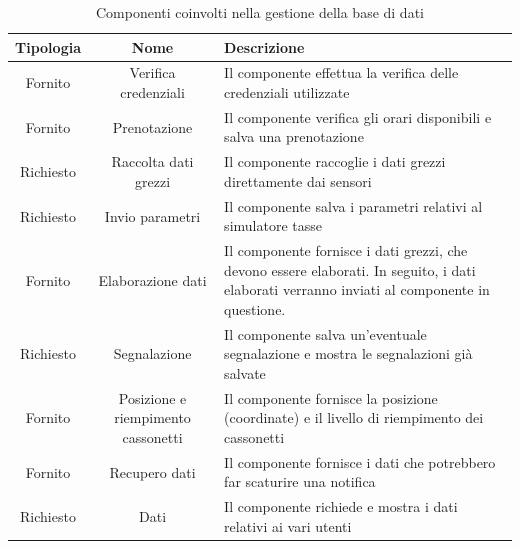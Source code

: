 \begin{table}[H]
    \centering
    \begin{tabular}{|c|c|p{9cm}|}
        \hline
        \textbf{Tipologia} & \textbf{Nome} & \textbf{Descrizione} \\
        \hline
        Fornito & Verifica credenziali & Il componente effettua la verifica delle credenziali utilizzate \\
        \hline
        Fornito & Prenotazione & Il componente verifica gli orari disponibili e salva una prenotazione \\
        \hline
        Richiesto & Raccolta dati grezzi & Il componente raccoglie i dati grezzi direttamente dai sensori \\
        \hline
        Richiesto & Invio parametri & Il componente salva i parametri relativi al simulatore tasse \\
        \hline
        Fornito & Elaborazione dati & Il componente fornisce i dati grezzi, che devono essere elaborati. In seguito, i dati elaborati verranno inviati al componente in questione. \\
        \hline
        Richiesto & Segnalazione & Il componente salva un'eventuale segnalazione e mostra le segnalazioni già salvate \\
        \hline
        Fornito & Posizione e riempimento cassonetti & Il componente fornisce la posizione (coordinate) e il livello di riempimento dei cassonetti \\
        \hline
        Fornito & Recupero dati & Il componente fornisce i dati che potrebbero far scaturire una notifica \\
        \hline
        Richiesto & Dati & Il componente richiede e mostra i dati relativi ai vari utenti \\
        \hline
    \end{tabular}
    \caption{Componenti coinvolti nella gestione della base di dati}
    \label{tab:base_dati}
\end{table}
